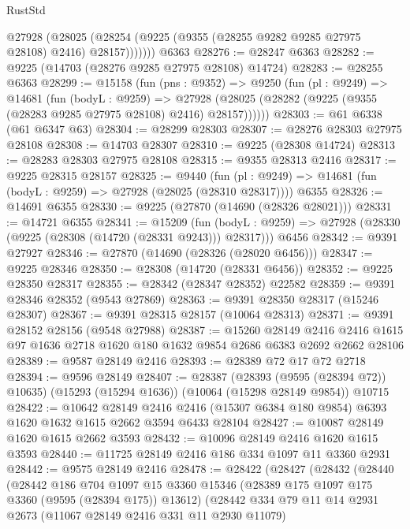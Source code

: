 \begin{lexlean}{RustStd}
\begin{coremodule}
          @27928
            (@28025 (@28254 (@9225 (@9355 (@28255 @9282 @9285 @27975 @28108) @2416) @28157)))))))
    @6363
@28276 := @28247 @6363
@28282 := @9225 (@14703 (@28276 @9285 @27975 @28108) @14724)
@28283 := @28255 @6363
@28299 := @15158
    (fun (pns : @9352) =>
    @9250
      (fun (pl : @9249) =>
      @14681
        (fun (bodyL : @9259) =>
        @27928 (@28025 (@28282 (@9225 (@9355 (@28283 @9285 @27975 @28108) @2416) @28157))))))
@28303 := @61 @6338 (@61 @6347 @63)
@28304 := @28299 @28303
@28307 := @28276 @28303 @27975 @28108
@28308 := @14703 @28307
@28310 := @9225 (@28308 @14724)
@28313 := @28283 @28303 @27975 @28108
@28315 := @9355 @28313 @2416
@28317 := @9225 @28315 @28157
@28325 := @9440
    (fun (pl : @9249) => @14681 (fun (bodyL : @9259) => @27928 (@28025 (@28310 @28317))))
    @6355
@28326 := @14691 @6355
@28330 := @9225 (@27870 (@14690 (@28326 @28021)))
@28331 := @14721 @6355
@28341 := @15209
    (fun (bodyL : @9259) => @27928 (@28330 (@9225 (@28308 (@14720 (@28331 @9243))) @28317)))
    @6456
@28342 := @9391 @27927
@28346 := @27870 (@14690 (@28326 (@28020 @6456)))
@28347 := @9225 @28346
@28350 := @28308 (@14720 (@28331 @6456))
@28352 := @9225 @28350 @28317
@28355 := @28342 (@28347 @28352) @22582
@28359 := @9391 @28346 @28352 (@9543 @27869)
@28363 := @9391 @28350 @28317 (@15246 @28307)
@28367 := @9391 @28315 @28157 (@10064 @28313)
@28371 := @9391 @28152 @28156 (@9548 @27988)
@28387 := @15260
    @28149
    @2416
    @2416
    @1615
    @97
    @1636
    @2718
    @1620
    @180
    @1632
    @9854
    @2686
    @6383
    @2692
    @2662
    @28106
@28389 := @9587 @28149 @2416
@28393 := @28389 @72 @17 @72 @2718
@28394 := @9596 @28149
@28407 := @28387
    (@28393 (@9595 (@28394 @72)) @10635)
    (@15293 (@15294 @1636))
    (@10064 (@15298 @28149 @9854))
    @10715
@28422 := @10642
    @28149
    @2416
    @2416
    (@15307 @6384 @180 @9854)
    @6393
    @1620
    @1632
    @1615
    @2662
    @3594
    @6433
    @28104
@28427 := @10087 @28149 @1620 @1615 @2662 @3593
@28432 := @10096 @28149 @2416 @1620 @1615 @3593
@28440 := @11725 @28149 @2416 @186 @334 @1097 @11 @3360 @2931
@28442 := @9575 @28149 @2416
@28478 := @28422
    (@28427
      (@28432
        (@28440
          (@28442
            @186
            @704
            @1097
            @15
            @3360
            @15346
            (@28389 @175 @1097 @175 @3360 (@9595 (@28394 @175)) @13612)
            (@28442
              @334
              @79
              @11
              @14
              @2931
              @2673
              (@11067 @28149 @2416 @331 @11 @2930 @11079)

\end{coremodule}
\end{lexlean}
